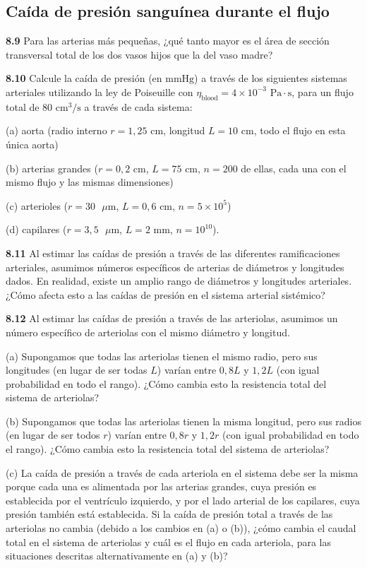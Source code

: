 \documentclass[12pt]{book}
\begin{document}
\subsection*{Caída de presión sanguínea durante el flujo}

\textbf{8.9} Para las arterias más pequeñas, ¿qué tanto mayor es el área de sección transversal total de los dos vasos hijos que la del vaso madre?

\textbf{8.10} Calcule la caída de presión (en $\text{mmHg}$) a través de los siguientes sistemas arteriales utilizando la ley de Poiseuille con $\eta_{\text{blood}} = 4 \times 10^{-3}\text{ Pa}\cdot\text{s}$, para un flujo total de $80\text{ cm}^3\text{/s}$ a través de cada sistema:

(a) aorta (radio interno $r = 1{,}25\text{ cm}$, longitud $L = 10\text{ cm}$, todo el flujo en esta única aorta)

(b) arterias grandes ($r = 0{,}2\text{ cm}$, $L = 75\text{ cm}$, $n = 200$ de ellas, cada una con el mismo flujo y las mismas dimensiones)

(c) arterioles ($r = 30\text{ }\mu\text{m}$, $L = 0{,}6\text{ cm}$, $n = 5 \times 10^5$)

(d) capilares ($r = 3{,}5\text{ }\mu\text{m}$, $L = 2\text{ mm}$, $n = 10^{10}$).

\textbf{8.11} Al estimar las caídas de presión a través de las diferentes ramificaciones arteriales, asumimos números específicos de arterias de diámetros y longitudes dados. En realidad, existe un amplio rango de diámetros y longitudes arteriales. ¿Cómo afecta esto a las caídas de presión en el sistema arterial sistémico?

\textbf{8.12} Al estimar las caídas de presión a través de las arteriolas, asumimos un número específico de arteriolas con el mismo diámetro y longitud.

(a) Supongamos que todas las arteriolas tienen el mismo radio, pero sus longitudes (en lugar de ser todas $L$) varían entre $0{,}8L$ y $1{,}2L$ (con igual probabilidad en todo el rango). ¿Cómo cambia esto la resistencia total del sistema de arteriolas?

(b) Supongamos que todas las arteriolas tienen la misma longitud, pero sus radios (en lugar de ser todos $r$) varían entre $0{,}8r$ y $1{,}2r$ (con igual probabilidad en todo el rango). ¿Cómo cambia esto la resistencia total del sistema de arteriolas?

(c) La caída de presión a través de cada arteriola en el sistema debe ser la misma porque cada una es alimentada por las arterias grandes, cuya presión es establecida por el ventrículo izquierdo, y por el lado arterial de los capilares, cuya presión también está establecida. Si la caída de presión total a través de las arteriolas no cambia (debido a los cambios en (a) o (b)), ¿cómo cambia el caudal total en el sistema de arteriolas y cuál es el flujo en cada arteriola, para las situaciones descritas alternativamente en (a) y (b)?
\end{document}
